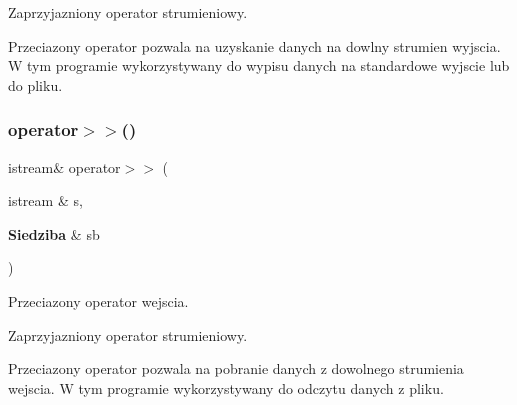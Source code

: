 Zaprzyjazniony operator strumieniowy.

Przeciazony operator pozwala na uzyskanie danych na dowlny strumien wyjscia. W tym programie wykorzystywany do wypisu danych na standardowe wyjscie lub do pliku. \mbox{\label{_siedziba_8cpp_ae5ef581c1d198741a15a44ad17c0960b}} 
\subsubsection{operator$>$$>$()}
{\footnotesize\ttfamily istream\& operator$>$$>$ (\begin{DoxyParamCaption}\item[{istream \&}]{s,  }\item[{\textbf{ Siedziba} \&}]{sb }\end{DoxyParamCaption})}



Przeciazony operator wejscia. 

Zaprzyjazniony operator strumieniowy.

Przeciazony operator pozwala na pobranie danych z dowolnego strumienia wejscia. W tym programie wykorzystywany do odczytu danych z pliku. 